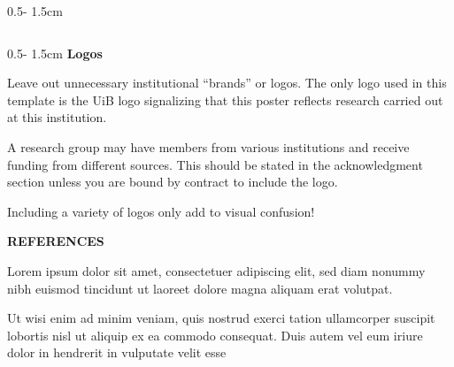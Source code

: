 \documentclass{uibposter}
\begin{document}
\begin{frame}
\begin{columns}
\begin{column}{0.5\textwidth - 1.5cm}
\begin{column}{0.5\textwidth - 1.5cm}
    \textbf{Logos}
    
    Leave out unnecessary institutional “brands” or logos. The only logo used in this template is the UiB logo signalizing that this poster reflects research carried out at this institution.
\vspace{0.2cm}

    A research group may have members from various institutions and receive funding from different sources. This should be stated in the acknowledgment section unless you are bound by contract to include the logo. 
\vspace{0.2cm}

    Including a variety of logos only add to visual confusion!
    \vspace{5cm}
    
    {\scriptsize
    \textbf{REFERENCES}

    Lorem ipsum dolor sit amet, consectetuer adipiscing elit, sed diam nonummy nibh euismod tincidunt ut laoreet dolore magna aliquam erat volutpat. 

    Ut wisi enim ad minim veniam, quis nostrud exerci tation ullamcorper suscipit lobortis nisl ut aliquip ex ea commodo consequat. Duis autem vel eum iriure dolor in hendrerit in vulputate velit esse

    }
\end{column}
\end{column}
\end{columns}





\end{frame}
\end{document}

